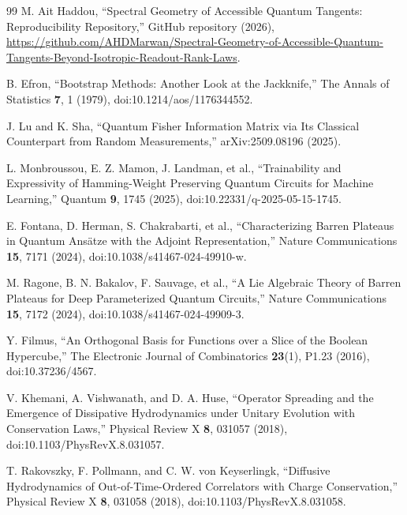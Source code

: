 \documentclass[ASNA,twocolumn]{USG}
\begin{document}
\begin{thebibliography}{99}
M. Ait Haddou,
``Spectral Geometry of Accessible Quantum Tangents: Reproducibility Repository,''
GitHub repository (2026),
\url{https://github.com/AHDMarwan/Spectral-Geometry-of-Accessible-Quantum-Tangents-Beyond-Isotropic-Readout-Rank-Laws}.

B. Efron,
``Bootstrap Methods: Another Look at the Jackknife,''
The Annals of Statistics \textbf{7}, 1 (1979), doi:10.1214/aos/1176344552.

J. Lu and K. Sha,
``Quantum Fisher Information Matrix via Its Classical Counterpart from Random Measurements,''
arXiv:2509.08196 (2025).

L. Monbroussou, E. Z. Mamon, J. Landman, et al.,
``Trainability and Expressivity of Hamming-Weight Preserving Quantum Circuits for Machine Learning,''
Quantum \textbf{9}, 1745 (2025), doi:10.22331/q-2025-05-15-1745.

E. Fontana, D. Herman, S. Chakrabarti, et al.,
``Characterizing Barren Plateaus in Quantum Ans\"atze with the Adjoint Representation,''
Nature Communications \textbf{15}, 7171 (2024), doi:10.1038/s41467-024-49910-w.

M. Ragone, B. N. Bakalov, F. Sauvage, et al.,
``A Lie Algebraic Theory of Barren Plateaus for Deep Parameterized Quantum Circuits,''
Nature Communications \textbf{15}, 7172 (2024), doi:10.1038/s41467-024-49909-3.

Y. Filmus,
``An Orthogonal Basis for Functions over a Slice of the Boolean Hypercube,''
The Electronic Journal of Combinatorics \textbf{23}(1), P1.23 (2016), doi:10.37236/4567.

V. Khemani, A. Vishwanath, and D. A. Huse,
``Operator Spreading and the Emergence of Dissipative Hydrodynamics under Unitary Evolution with Conservation Laws,''
Physical Review X \textbf{8}, 031057 (2018), doi:10.1103/PhysRevX.8.031057.

T. Rakovszky, F. Pollmann, and C. W. von Keyserlingk,
``Diffusive Hydrodynamics of Out-of-Time-Ordered Correlators with Charge Conservation,''
Physical Review X \textbf{8}, 031058 (2018), doi:10.1103/PhysRevX.8.031058.

\end{thebibliography}

\clearpage
\setcounter{section}{0}
\setcounter{figure}{0}
\setcounter{table}{0}
\setcounter{equation}{0}
\renewcommand{\thesection}{S\arabic{section}}
\renewcommand{\thefigure}{S\arabic{figure}}
\renewcommand{\thetable}{S\arabic{table}}
\renewcommand{\theequation}{S\arabic{equation}}
\end{document}
